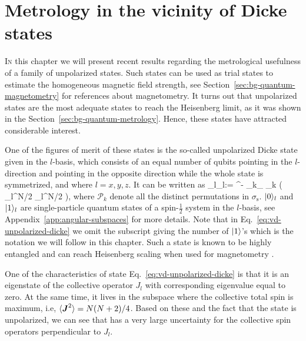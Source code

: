 \section{Metrology in the vicinity of Dicke states}

\label{sec:vd}


\lettrine[lines=2, findent=3pt,nindent=0pt]{I}{n} this chapter we will present recent results regarding the metrological usefulness of a family of unpolarized states.
Such states can be used as trial states to estimate the homogeneous magnetic field strength, see Section~\ref{sec:bg-quantum-magnetometry} for references about magnetometry.
It turns out that unpolarized states are the most adequate states to reach the Heisenberg limit, as it was shown in the Section~\ref{sec:bg-quantum-metrology}.
Hence, these states have attracted considerable interest.

One of the figures of merit of these states is the so-called unpolarized Dicke state \cite{Dicke1954} given in the $l$-basis, which consists of an equal number of qubits pointing in the $l$-direction and pointing in the opposite direction while the whole state is symmetrized, and where $l=x,y,z$.
It can be written as
\be
   _l\equiv {}_l:= ^{-}
  \sum_{k\in \sigma_}
  _{k} ( _l^{\otimes N/2} _l^{\otimes N/2} ),
  \label{eq:vd-unpolarized-dicke}
\ee
where $\mathcal{P}_k$ denote all the distinct permutations in $\sigma_\text{s}$.
$\vert{0}\rangle_l$ and $\vert{1}\rangle_l$ are single-particle quantum states of a spin-$\frac{1}{2}$ system in the $l$-basis, see Appendix~\ref{app:angular-subspaces} for more details.
Note that in Eq.~\eqref{eq:vd-unpolarized-dicke} we omit the subscript giving the number of $\vert{1}\rangle$'s which is the notation we will follow in this chapter.
Such a state is known to be highly entangled \cite{Toth2007, Toth2009a} and can reach Heisenberg scaling when used for magnetometry \cite{Holland1993}.

One of the characteristics of state Eq.~\eqref{eq:vd-unpolarized-dicke} is that it is an eigenstate of the collective operator $J_l$ with corresponding eigenvalue equal to zero.
At the same time, it lives in the subspace where the collective total spin is maximum, i.e, $\langle{\ensuremath{\boldsymbol{J}}^2}\rangle=N(N+2)/4$.
Based on these and the fact that the state is unpolarized, we can see that has a very large uncertainty for the collective spin operators perpendicular to $J_l$.

